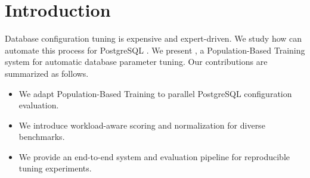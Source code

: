 \section{Introduction}
Database configuration tuning is expensive and expert-driven.
We study how \pbt can automate this process for PostgreSQL \cite{jaderberg2017pbt}.
We present \sysname, a Population-Based Training system for automatic database parameter tuning.
Our contributions are summarized as follows.
\begin{itemize}
\item We adapt Population-Based Training to parallel PostgreSQL configuration evaluation.
\item We introduce workload-aware scoring and normalization for diverse benchmarks.
\item We provide an end-to-end system and evaluation pipeline for reproducible tuning experiments.
\end{itemize}
